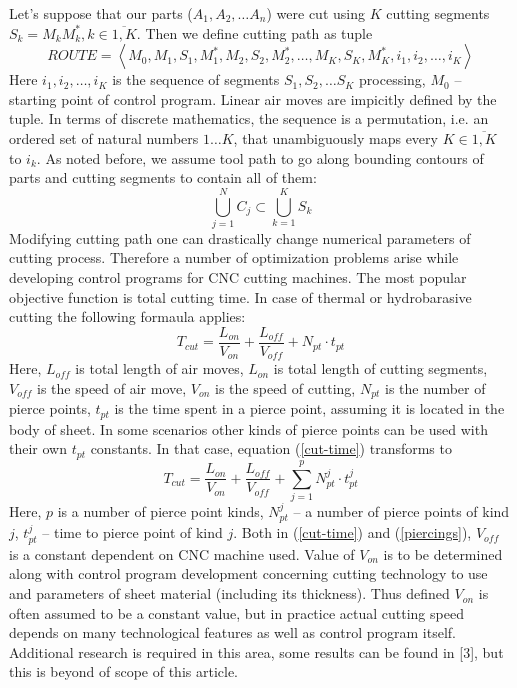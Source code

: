 \documentclass{../download/tPRS2e}
\begin{document}
Let's suppose that our parts
($A_1, A_2, \dots A_n$) were cut
using $K$ cutting segments
$S_k = M_kM_k^*, k \in \overline{1, K}$.
Then we define cutting path as tuple
\begin{equation}
    ROUTE = 
    \left< M_0, M_1, S_1, M_1^*, M_2, S_2, M_2^*, \dots, M_K, S_K, M_K^*, i_1, i_2, \dots, i_K\right>
    \label{tuple}
\end{equation}
Here $i_1, i_2, \dots, i_K$ is the sequence of segments
$S_1, S_2, \dots S_K$ processing,
$M_0$ -- starting point of control program.
Linear air moves are impicitly defined by the tuple.
In terms of discrete mathematics,
the sequence is a permutation,
i.e. an ordered set of natural numbers $1\dots K$,
that unambiguously maps every
$K \in \overline{1, K}$ to $i_k$.
As noted before,
we assume tool path to go along
bounding contours of parts
and cutting segments to contain all of them:
$$
\bigcup_{j=1}^N C_j \subset \bigcup_{k=1}^K S_k
$$
Modifying cutting path one can
drastically change numerical parameters
of cutting process.
Therefore a number of optimization problems
arise while developing
control programs for CNC cutting machines.
The most popular objective function
is total cutting time.
In case of thermal or 
hydrobarasive cutting the following formaula applies:
\begin{equation}
    T_{cut} = \frac{L_{on}}{V_{on}} + \frac{L_{off}}{V_{off}} + N_{pt} \cdot t_{pt}
    \label{cut-time}
\end{equation}
Here,
$L_{off}$ is total length of air moves,
$L_{on}$ is total length of cutting segments,
$V_{off}$ is the speed of air move,
$V_{on}$ is the speed of cutting,
$N_{pt}$ is the number of pierce points,
$t_{pt}$ is the time spent in a pierce point,
assuming it is located in the body of sheet.
In some scenarios other kinds of pierce points
can be used
with their own $t_{pt}$ constants.
In that case, equation (\ref{cut-time})
transforms to
\begin{equation}
    T_{cut} = \frac{L_{on}}{V_{on}} + \frac{L_{off}}{V_{off}}
    + \sum_{j=1}^p N_{pt}^j \cdot t_{pt}^j
    \label{piercings}
\end{equation}
Here,
$p$ is a number of pierce point kinds,
$N_{pt}^j$ -- a number of pierce points of kind $j$,
$t_{pt}^j$ -- time to pierce point of kind $j$.
Both in (\ref{cut-time}) and (\ref{piercings}),
$V_{off}$ is a constant dependent on CNC machine used.
Value of $V_{on}$ is to be determined along with
control program development
concerning cutting technology to use
and parameters of sheet material
(including its thickness).
Thus defined $V_{on}$
is often assumed to be a constant value,
but in practice
actual cutting speed depends on
many technological features as well as 
control program itself.
Additional research is required in this area,
some results can be found in [3],
but this is beyond of scope of this article.
\end{document}
